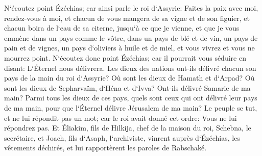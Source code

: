 \verse N`écoutez point Ézéchias; car ainsi parle le roi d`Assyrie: Faites la paix avec moi, rendez-vous à moi, et chacun de vous mangera de sa vigne et de son figuier, et chacun boira de l`eau de sa citerne, 
\verse jusqu`à ce que je vienne, et que je vous emmène dans un pays comme le vôtre, dans un pays de blé et de vin, un pays de pain et de vignes, un pays d`oliviers à huile et de miel, et vous vivrez et vous ne mourrez point. N`écoutez donc point Ézéchias; car il pourrait vous séduire en disant: L`Éternel nous délivrera. 
\verse Les dieux des nations ont-ils délivré chacun son pays de la main du roi d`Assyrie? 
\verse Où sont les dieux de Hamath et d`Arpad? Où sont les dieux de Sepharvaïm, d`Héna et d`Ivva? Ont-ils délivré Samarie de ma main? 
\verse Parmi tous les dieux de ces pays, quels sont ceux qui ont délivré leur pays de ma main, pour que l`Éternel délivre Jérusalem de ma main? 
\verse Le peuple se tut, et ne lui répondit pas un mot; car le roi avait donné cet ordre: Vous ne lui répondrez pas. 
\verse Et Éliakim, fils de Hilkija, chef de la maison du roi, Schebna, le secrétaire, et Joach, fils d`Asaph, l`archiviste, vinrent auprès d`Ézéchias, les vêtements déchirés, et lui rapportèrent les paroles de Rabschaké. 

\chapter{}

